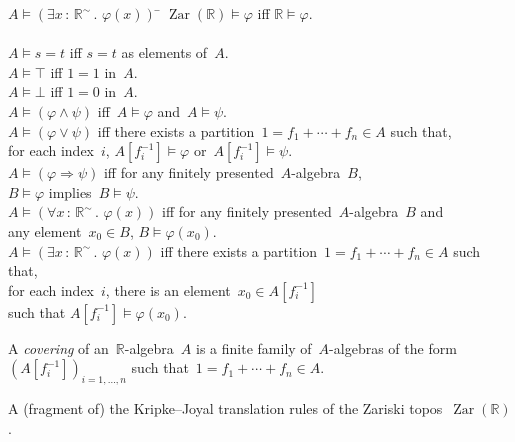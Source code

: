 \documentclass[graybox]{svmult}
\newcommand{\RR}{\mathbb{R}}
\DeclareMathOperator{\Zar}{Zar}
\renewcommand{\_}{\mathpunct{.}\,}
\newcommand{\?}{\,{:}\,}
\begin{document}
\begin{table}
  \centering
  \begin{framed}
    \begin{tabbing}
      $A \models (\exists x\?\RR^\sim\_ \varphi(x))$ \= \kill
      $\Zar(\RR) \models \varphi$ \> iff $\RR \models \varphi$. \\\\
      $A \models s = t$ \> iff $s = t$ as elements of~$A$. \\
      $A \models \top$ \> iff $1 = 1$ in~$A$. \\
      $A \models \bot$ \> iff $1 = 0$ in~$A$. \\
      $A \models (\varphi \wedge \psi)$ \> iff~$A \models \varphi$ and~$A \models \psi$. \\
      $A \models (\varphi \vee \psi)$ \> iff there exists a partition~$1 = f_1 + \cdots + f_n \in A$ such that, \\
      \> \qquad for each index~$i$, $A[f_i^{-1}] \models \varphi$ or~$A[f_i^{-1}] \models \psi$. \\
      $A \models (\varphi \Rightarrow \psi)$ \> iff for any finitely
      presented~$A$-algebra~$B$, \\
      \> \qquad $B \models \varphi$ implies~$B \models \psi$. \\
      $A \models (\forall x\?\RR^\sim\_ \varphi(x))$ \> iff for any finitely
      presented~$A$-algebra~$B$ and \\
      \> \qquad any element~$x_0 \in B$, $B \models \varphi(x_0)$. \\
      $A \models (\exists x\?\RR^\sim\_ \varphi(x))$ \> iff there exists a partition~$1 = f_1 + \cdots + f_n \in A$ such that, \\
      \> \qquad for each index~$i$, there is an element~$x_0 \in A[f_i^{-1}]$ \\
      \> \qquad such that $A[f_i^{-1}] \models \varphi(x_0)$.
    \end{tabbing}

    \bigskip
    \justify
    A \emph{covering} of an~$\RR$-algebra~$A$ is a finite family of~$A$-algebras of the
    form~$(A[f_i^{-1}])_{i=1,\ldots,n}$ such that~$1 = f_1 + \cdots + f_n \in A$.
  \end{framed}
  \bigskip

  \caption{\label{table:zariski}A (fragment of) the Kripke--Joyal translation
  rules of the Zariski topos~$\Zar(\RR)$.}
\end{table}
\end{document}
